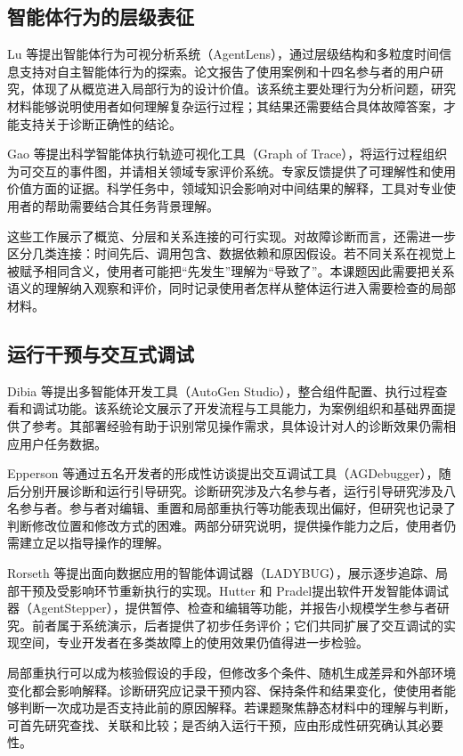 \subsection{智能体行为的层级表征}

Lu 等\cite{ref22}提出智能体行为可视分析系统（AgentLens），通过层级结构和多粒度时间信息支持对自主智能体行为的探索。论文报告了使用案例和十四名参与者的用户研究，体现了从概览进入局部行为的设计价值。该系统主要处理行为分析问题，研究材料能够说明使用者如何理解复杂运行过程；其结果还需要结合具体故障答案，才能支持关于诊断正确性的结论。

Gao 等\cite{ref24}提出科学智能体执行轨迹可视化工具（Graph of Trace），将运行过程组织为可交互的事件图，并请相关领域专家评价系统。专家反馈提供了可理解性和使用价值方面的证据。科学任务中，领域知识会影响对中间结果的解释，工具对专业使用者的帮助需要结合其任务背景理解。

这些工作展示了概览、分层和关系连接的可行实现。对故障诊断而言，还需进一步区分几类连接：时间先后、调用包含、数据依赖和原因假设。若不同关系在视觉上被赋予相同含义，使用者可能把“先发生”理解为“导致了”。本课题因此需要把关系语义的理解纳入观察和评价，同时记录使用者怎样从整体运行进入需要检查的局部材料。

\subsection{运行干预与交互式调试}

Dibia 等\cite{ref25}提出多智能体开发工具（AutoGen Studio），整合组件配置、执行过程查看和调试功能。该系统论文展示了开发流程与工具能力，为案例组织和基础界面提供了参考。其部署经验有助于识别常见操作需求，具体设计对人的诊断效果仍需相应用户任务数据。

Epperson 等\cite{ref02}通过五名开发者的形成性访谈提出交互调试工具（AGDebugger），随后分别开展诊断和运行引导研究。诊断研究涉及六名参与者，运行引导研究涉及八名参与者。参与者对编辑、重置和局部重执行等功能表现出偏好，但研究也记录了判断修改位置和修改方式的困难。两部分研究说明，提供操作能力之后，使用者仍需建立足以指导操作的理解。

Rorseth 等\cite{ref28}提出面向数据应用的智能体调试器（LADYBUG），展示逐步追踪、局部干预及受影响环节重新执行的实现。Hutter 和 Pradel\cite{ref18}提出软件开发智能体调试器（AgentStepper），提供暂停、检查和编辑等功能，并报告小规模学生参与者研究。前者属于系统演示，后者提供了初步任务评价；它们共同扩展了交互调试的实现空间，专业开发者在多类故障上的使用效果仍值得进一步检验。

局部重执行可以成为核验假设的手段，但修改多个条件、随机生成差异和外部环境变化都会影响解释。诊断研究应记录干预内容、保持条件和结果变化，使使用者能够判断一次成功是否支持此前的原因解释。若课题聚焦静态材料中的理解与判断，可首先研究查找、关联和比较；是否纳入运行干预，应由形成性研究确认其必要性。

